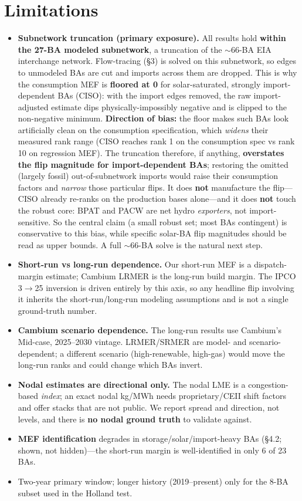 \documentclass[11pt]{article}
\newcommand{\kgmwh}{kg/MWh}
\begin{document}
\section{Limitations}

\begin{itemize}
\item \textbf{Subnetwork truncation (primary exposure).} All results hold
\textbf{within the 27-BA modeled subnetwork}, a truncation of the $\sim$66-BA EIA
interchange network. Flow-tracing (\S3) is solved on this subnetwork, so edges to
unmodeled BAs are cut and imports across them are dropped. This is why the
consumption MEF is \textbf{floored at 0} for solar-saturated, strongly
import-dependent BAs (CISO): with the import edges removed, the raw import-adjusted
estimate dips physically-impossibly negative and is clipped to the non-negative
minimum. \textbf{Direction of bias:} the floor makes such BAs look artificially
clean on the consumption specification, which \emph{widens} their measured rank
range (CISO reaches rank 1 on the consumption spec vs rank 10 on regression MEF).
The truncation therefore, if anything, \textbf{overstates the flip magnitude for
import-dependent BAs}; restoring the omitted (largely fossil) out-of-subnetwork
imports would raise their consumption factors and \emph{narrow} those particular
flips. It does \textbf{not} manufacture the flip---CISO already re-ranks on the
production bases alone---and it does \textbf{not} touch the robust core: BPAT and
PACW are net hydro \emph{exporters}, not import-sensitive. So the central claim (a
small robust set; most BAs contingent) is conservative to this bias, while specific
solar-BA flip magnitudes should be read as upper bounds. A full $\sim$66-BA solve
is the natural next step.
\item \textbf{Short-run vs long-run dependence.} Our short-run MEF is a
dispatch-margin estimate; Cambium LRMER is the long-run build margin. The IPCO
3$\to$25 inversion is driven entirely by this axis, so any headline flip involving
it inherits the short-run/long-run modeling assumptions and is not a single
ground-truth number.
\item \textbf{Cambium scenario dependence.} The long-run results use Cambium's
Mid-case, 2025--2030 vintage. LRMER/SRMER are model- and scenario-dependent; a
different scenario (high-renewable, high-gas) would move the long-run ranks and
could change which BAs invert.
\item \textbf{Nodal estimates are directional only.} The nodal LME is a
congestion-based \emph{index}; an exact nodal \kgmwh{} needs proprietary/CEII shift
factors and offer stacks that are not public. We report spread and direction, not
levels, and there is \textbf{no nodal ground truth} to validate against.
\item \textbf{MEF identification} degrades in storage/solar/import-heavy BAs
(\S4.2; shown, not hidden)---the short-run margin is well-identified in only 6 of
23 BAs.
\item Two-year primary window; longer history (2019--present) only for the 8-BA
subset used in the Holland test.
\end{itemize}
\end{document}
